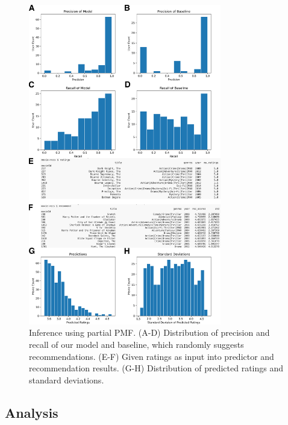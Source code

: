 \documentclass{article}
\begin{document}
\begin{figure}
    \centering
    \includegraphics[width=0.75\textwidth]{inference.jpg}
    \caption{Inference using partial PMF. (A-D) Distribution of precision and recall of our model and baseline, which randomly suggests recommendations. (E-F) Given ratings as input into predictor and recommendation results. (G-H) Distribution of predicted ratings and standard deviations.}
    \label{fig:inference}
\end{figure}

\subsection{Analysis}
\end{document}
